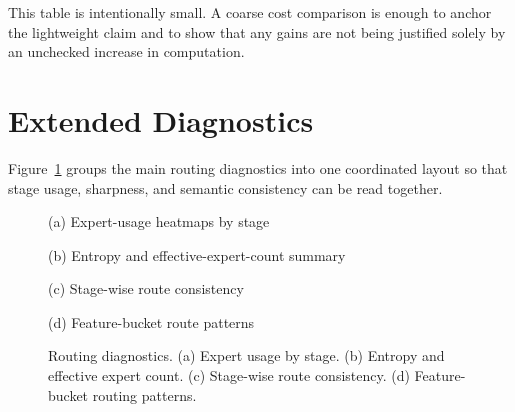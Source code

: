 \documentclass[sigconf,review,anonymous]{acmart}
\newcommand{\placeholderpanel}[1]{\fbox{\rule{0pt}{#1}\rule{0.92\linewidth}{0pt}}}
\begin{document}
This table is intentionally small. A coarse cost comparison is enough to anchor the lightweight claim and to show that any gains are not being justified solely by an unchecked increase in computation.

\section{Extended Diagnostics}
\label{app:diagnostics}
Figure~\ref{fig:appendix-diagnostics} groups the main routing diagnostics into one coordinated layout so that stage usage, sharpness, and semantic consistency can be read together.

\begin{figure}[t]
  \centering
  \begin{minipage}[t]{0.48\linewidth}
    \centering
    \placeholderpanel{1.18in}

    \vspace{0.35em}
    {\footnotesize (a) Expert-usage heatmaps by stage}
  \end{minipage}\hfill
  \begin{minipage}[t]{0.48\linewidth}
    \centering
    \placeholderpanel{1.18in}

    \vspace{0.35em}
    {\footnotesize (b) Entropy and effective-expert-count summary}
  \end{minipage}

  \vspace{0.8em}

  \begin{minipage}[t]{0.48\linewidth}
    \centering
    \placeholderpanel{1.18in}

    \vspace{0.35em}
    {\footnotesize (c) Stage-wise route consistency}
  \end{minipage}\hfill
  \begin{minipage}[t]{0.48\linewidth}
    \centering
    \placeholderpanel{1.18in}

    \vspace{0.35em}
    {\footnotesize (d) Feature-bucket route patterns}
  \end{minipage}
  \caption{Routing diagnostics. (a) Expert usage by stage. (b) Entropy and effective expert count. (c) Stage-wise route consistency. (d) Feature-bucket routing patterns.}
  \label{fig:appendix-diagnostics}
\end{figure}
\end{document}
